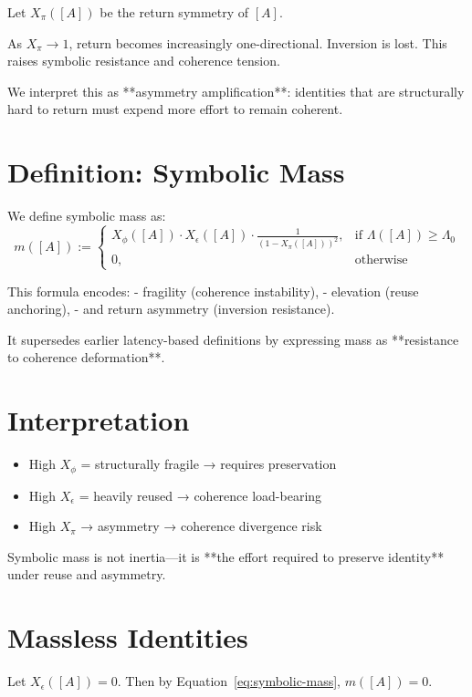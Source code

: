 Let $X_\pi([A])$ be the return symmetry of $[A]$.

As $X_\pi \to 1$, return becomes increasingly one-directional. Inversion is lost. This raises symbolic resistance and coherence tension.

We interpret this as **asymmetry amplification**: identities that are structurally hard to return must expend more effort to remain coherent.

\section{Definition: Symbolic Mass}

We define symbolic mass as:
\begin{equation} \label{eq:symbolic-mass}
m([A]) := 
\begin{cases}
X_\phi([A]) \cdot X_\epsilon([A]) \cdot \frac{1}{(1 - X_\pi([A]))^2}, & \text{if } \Lambda([A]) \geq \Lambda_0 \\
0, & \text{otherwise}
\end{cases}
\end{equation}

This formula encodes:
- fragility (coherence instability),
- elevation (reuse anchoring),
- and return asymmetry (inversion resistance).

It supersedes earlier latency-based definitions by expressing mass as **resistance to coherence deformation**.

\section{Interpretation}

\begin{itemize}
    \item High $X_\phi$ = structurally fragile → requires preservation
    \item High $X_\epsilon$ = heavily reused → coherence load-bearing
    \item High $X_\pi$ → asymmetry → coherence divergence risk
\end{itemize}

Symbolic mass is not inertia—it is **the effort required to preserve identity** under reuse and asymmetry.

\section{Massless Identities}

Let $X_\epsilon([A]) = 0$. Then by Equation~\ref{eq:symbolic-mass}, $m([A]) = 0$.

